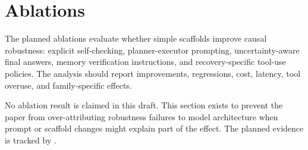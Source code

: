 \section{Ablations}

The planned ablations evaluate whether simple scaffolds improve causal robustness: explicit self-checking, planner-executor prompting, uncertainty-aware final answers, memory verification instructions, and recovery-specific tool-use policies. The analysis should report improvements, regressions, cost, latency, tool overuse, and family-specific effects.

No ablation result is claimed in this draft. This section exists to prevent the paper from over-attributing robustness failures to model architecture when prompt or scaffold changes might explain part of the effect. The planned evidence is tracked by .
